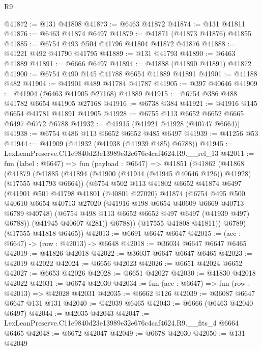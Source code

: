 \begin{lexlean}{R9}
\begin{coremodule}
@41872 := @131 @41808
@41873 := @6463 @41872
@41874 := @131 @41811
@41876 := @6463 @41874 @6497
@41879 := @41871 (@41873 @41876) @41855
@41885 := @6754 @493 @504 @41796 @41804 @41872 @41876
@41888 := @41221 @492 @41790 @41795
@41889 := @131 @41793
@41890 := @6463 @41889
@41891 := @6666 @6497
@41894 := @41888 (@41890 @41891) @41872
@41900 := @6754 @490 @145 @41788 @6654 @41889 @41891
@41901 := @41188 @482
@41904 := @41901 @489 @41784 @41787
@41905 := @397 @40646
@41909 := @41904 (@6463 @41905 @27168) @41889
@41915 := @6754 @386 @488 @41782 @6654 @41905 @27168
@41916 := @6738 @384
@41921 := @41916 @145 @6654 @41781 @41891 @41905
@41928 := @6755 @113 @6652 @6652 @6665 @6497 @6772 @6788
@41932 := @41915 (@41921 @41928 (@40747 @6664))
@41938 := @6754 @486 @113 @6652 @6652 @485 @6497
@41939 := @41256 @53
@41944 := @41909 (@41932 (@41938 (@41939 @485) @6788))
@41945 := LexLeanPreserve.C11e9840d23e13989e32e676c4caf4624.R9.__rel_13
@42011 := fun (label : @6647) =>
  fun (payload : @6647) =>
  @41851
    (@41862
      (@41868
        (@41879
          (@41885
            (@41894 (@41900 (@41944 (@41945 @40646 @126)) @41928) (@17555 @41793 @6664))
            (@6754
              @502
              @113
              @41802
              @6652
              @41874
              @6497
              (@41901
                @501
                @41798
                @41801
                (@40801 @27020)
                @41874
                (@6754
                  @495
                  @500
                  @40610
                  @6654
                  @40713
                  @27020
                  (@41916 @198 @6654 @40609 @6669 @40713 @6789 @40748)
                  (@6754 @498 @113 @6652 @6652 @497 @6497 (@41939 @497) @6788))
                (@41945 @40607 @281))
              @6788))
          (@17555 @41808 @41811))
        @6789)
      (@17555 @41818 @6465))
@42013 := @6691 @6647 @6647
@42015 := (acc : @6647) -> (row : @42013) -> @6648
@42018 := @36034 @6647 @6647 @6465
@42019 := @41826 @42018
@42022 := @36037 @6647 @6647 @6465
@42023 := @42019 @42022
@42024 := @6656 @42023
@42026 := @6651 @42024 @6652
@42027 := @6653 @42026
@42028 := @6651 @42027
@42030 := @41830 @42018 @42022
@42031 := @6674 @42030
@42034 := fun (acc : @6647) => fun (row : @42013) => @42028 @42031
@42035 := @6662 @126
@42039 := @36087 @6647 @6647 @131 @131
@42040 := @42039 @6465
@42043 := @6666 (@6463 @42040 @6497)
@42044 := @42035 @42043
@42047 := LexLeanPreserve.C11e9840d23e13989e32e676c4caf4624.R9.__fits_4 @6664 @6465
@42048 := @6672 @42047
@42049 := @6678 @42030
@42050 := @131 @42049

\end{coremodule}
\end{lexlean}
